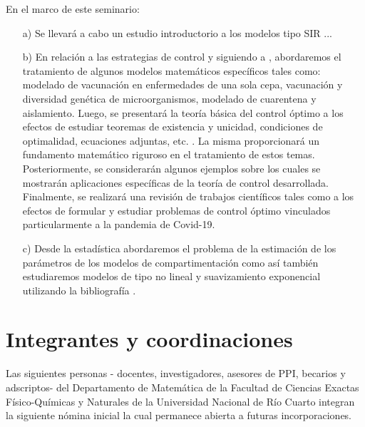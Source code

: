 \documentclass{article}
\begin{document}
En el marco de este seminario:
\begin{itemize}
	\item[a)]   Se llevará  a cabo un estudio introductorio a los modelos tipo SIR ... 
	\item[b)] 
	En relación a las estrategias de control y  siguiendo a \cite{MaiaMartcheva480}, abordaremos el tratamiento de  algunos modelos matemáticos específicos tales como: modelado de vacunación en enfermedades de una sola cepa, vacunación y diversidad genética de microorganismos, modelado de cuarentena y aislamiento. Luego,  se presentará la teoría básica del control óptimo a los efectos de estudiar teoremas de existencia y unicidad, condiciones de optimalidad, ecuaciones adjuntas, etc. \cite{SS,LAH,LW}. La misma proporcionará un fundamento matemático riguroso en el tratamiento de estos temas. Posteriormente, se considerarán algunos ejemplos sobre los cuales se mostrarán aplicaciones específicas de la teoría de control desarrollada. Finalmente, se realizará una revisión de trabajos científicos tales como \cite{ALA,AAC,AGS,BKO,BGO,C,HY,ST,ZKJ} a los efectos de formular y estudiar problemas de control óptimo vinculados particularmente a la pandemia de Covid-19.
	\item[c)] Desde la estadística abordaremos el problema de la estimación de los parámetros de los modelos de compartimentación como así también estudiaremos modelos de tipo   no lineal y suavizamiento exponencial utilizando la bibliografía  
	\cite{AthaHynd, Hyndvarios, KR, JZC, PM,  hyn1, hyn2, fergu2020}. 	\end{itemize} 
 


\section{Integrantes y coordinaciones}\label{integrantes}

Las siguientes personas - docentes, investigadores, asesores de PPI, becarios y adscriptos-  del Departamento de Matemática de la Facultad de Ciencias Exactas Físico-Químicas y Naturales de la Universidad Nacional de Río Cuarto integran la siguiente nómina inicial la cual permanece abierta a futuras incorporaciones.
\end{document}
